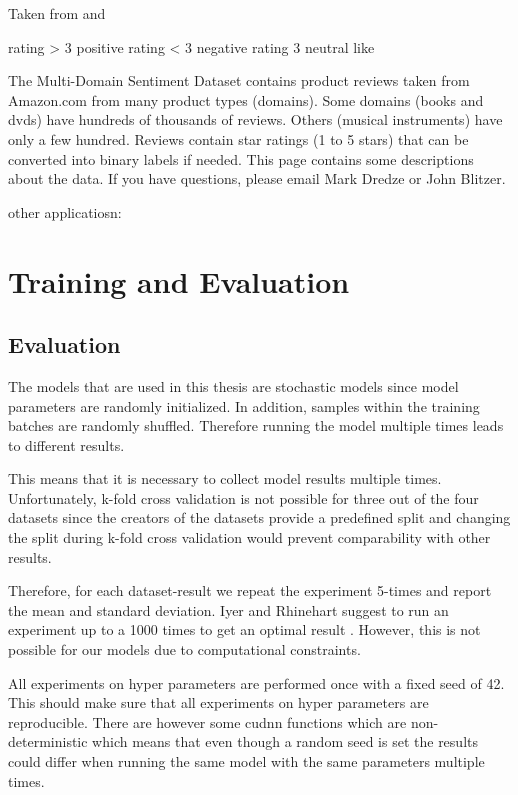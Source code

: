 Taken from \cite{McAuley2015} and \cite{He2016}


\cite{Blitzer2007}
\cite{Blitzer2008}

rating > 3 positive
rating < 3 negative
rating 3 neutral 			like \cite{Blitzer2007}

The Multi-Domain Sentiment Dataset contains product reviews taken from Amazon.com from many product types (domains). Some domains (books and dvds) have hundreds of thousands of reviews. Others (musical instruments) have only a few hundred. Reviews contain star ratings (1 to 5 stars) that can be converted into binary labels if needed. This page contains some descriptions about the data. If you have questions, please email Mark Dredze or John Blitzer. 


other applicatiosn:
\cite{Blitzer2008}



\section{Training and Evaluation}
\label{sec:05_TrainingAndEvaluation}

\subsection{Evaluation}

The models that are used in this thesis are stochastic models since model parameters are randomly initialized. In addition, samples within the training batches are randomly shuffled. Therefore running the model multiple times leads to different results.

This means that it is necessary to collect model results multiple times. Unfortunately, k-fold cross validation is not possible for three out of the four datasets since the creators of the datasets provide a predefined split and changing the split during k-fold cross validation would prevent comparability with other results.

Therefore, for each dataset-result we repeat the experiment 5-times and report the mean and standard deviation. Iyer and Rhinehart suggest to run an experiment up to a 1000 times to get an optimal result \cite{Iyer1999}. However, this is not possible for our models due to computational constraints.

All experiments on hyper parameters are performed once with a fixed seed of 42. This should make sure that all experiments on hyper parameters are reproducible. There are however some cudnn functions which are non-deterministic which means that even though a random seed is set the results could differ when running the same model with the same parameters multiple times.

